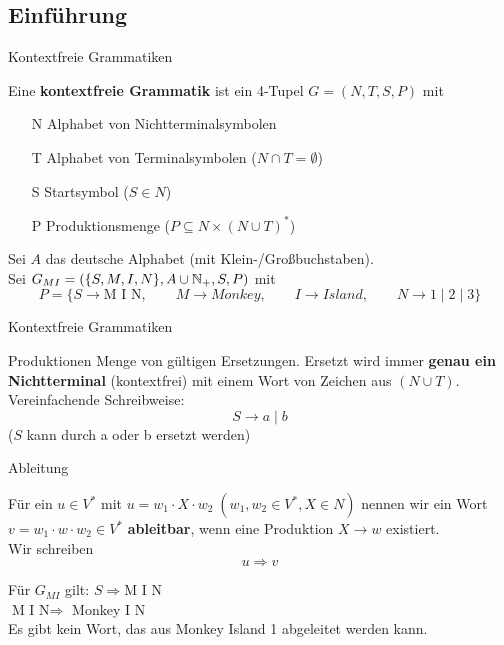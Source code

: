 \subsection{Einführung}
\begin{frame}{Kontextfreie Grammatiken}
	
	\begin{Definition}
		Eine \textbf{kontextfreie Grammatik} ist ein 4-Tupel $G = (N, T, S ,P)$ mit
		\begin{itemize}
			\item[N] Alphabet von Nichtterminalsymbolen
			\item[T] Alphabet von Terminalsymbolen ($N \cap T = \emptyset$)
			\item[S] Startsymbol ($S \in N$)
			\item[P] Produktionsmenge ($P \subseteq N \times (N \cup T)^\ast$)
		\end{itemize}
	\end{Definition}

	\pause
	\begin{Beispiel}
		Sei $A$ das deutsche Alphabet (mit Klein-/Großbuchstaben).\\
		Sei $G_{MI} = (\{S, M, I, N\}, A \cup \mathbb{N}_+, S, P)$ mit
		\[
			P = \{S \to \text{M I N}, \qquad M \to Monkey, \qquad I \to Island, \qquad N \to 1 \mid 2 \mid 3 \}
		\]
	\end{Beispiel}
\end{frame}

\begin{frame}{Kontextfreie Grammatiken}
	\begin{block}{Produktionen}
		Menge von gültigen Ersetzungen. Ersetzt wird immer \textbf{genau ein Nichtterminal} (kontextfrei) mit einem Wort von Zeichen aus $(N \cup T)$.\\
		\pause
		Vereinfachende Schreibweise: $$S \to a \mid b$$ ($S$ kann durch a oder b ersetzt werden)
	\end{block}
\end{frame}

\begin{frame}{Ableitung}
	\begin{Definition}
		Für ein  $u \in V^\ast$ mit $u = w_1 \cdot X \cdot w_2 \; (w_1, w_2 \in V^\ast, X \in N)$ nennen wir ein Wort $v = w_1 \cdot w \cdot w_2 \in V^\ast$ \textbf{ableitbar}, wenn eine Produktion $X \to w$ existiert.\\
		Wir schreiben $$u \Rightarrow v$$
	\end{Definition}
	
	\pause
	\begin{Beispiel}
		Für $G_{MI}$ gilt: $S \Rightarrow \text{M I N}$\\
		$ \text{M I N} \Rightarrow$ Monkey I N\\
		Es gibt kein Wort, das aus Monkey Island 1 abgeleitet werden kann.
	\end{Beispiel}
	
\end{frame}

